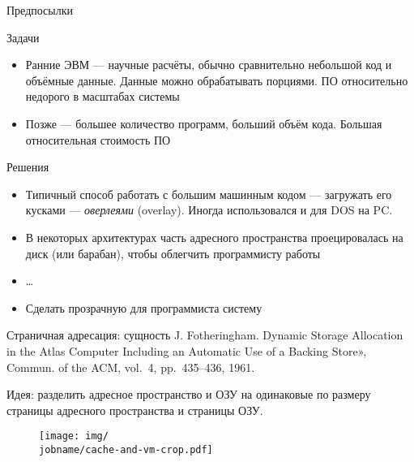 \documentclass[xetex,aspectratio=43]{beamer}
\begin{document}
\begin{frame}{Предпосылки}
    \begin{block}{Задачи}
        \begin{itemize}
            \tightlist
            \item
            Ранние ЭВМ --- научные расчёты, обычно сравнительно небольшой код и
            объёмные данные. Данные можно обрабатывать порциями. ПО относительно
            недорого в масштабах системы
            \item
            Позже --- большее количество программ, больший объём кода. Большая
            относительная стоимость ПО
        \end{itemize}
    \end{block}

    \begin{block}{Решения}
        \begin{itemize}
            \tightlist
            \item
            Типичный способ работать с большим машинным кодом --- загружать его
            кусками --- \emph{оверлеями} (overlay). Иногда использовался и для DOS
            на PC.
            \item
            В некоторых архитектурах часть адресного пространства проецировалась
            на диск (или барабан), чтобы облегчить программисту работы
            \item
            \ldots{}
            \item
            Сделать прозрачную для программиста систему
        \end{itemize}
    \end{block}
\end{frame}

\begin{frame}{Страничная адресация: сущность}
    J. Fotheringham. Dynamic Storage Allocation in the Atlas Computer
    Including an Automatic Use of a Backing Store», Commun. of the ACM,
    vol.~4, pp.~435--436, 1961.

    Идея: разделить адресное пространство и ОЗУ на одинаковые по размеру страницы адресного
    пространства и страницы ОЗУ.

    \begin{figure}
        \texttt{[image: img/\\jobname/cache-and-vm-crop.pdf]}
    \end{figure}
\end{frame}
\end{document}
